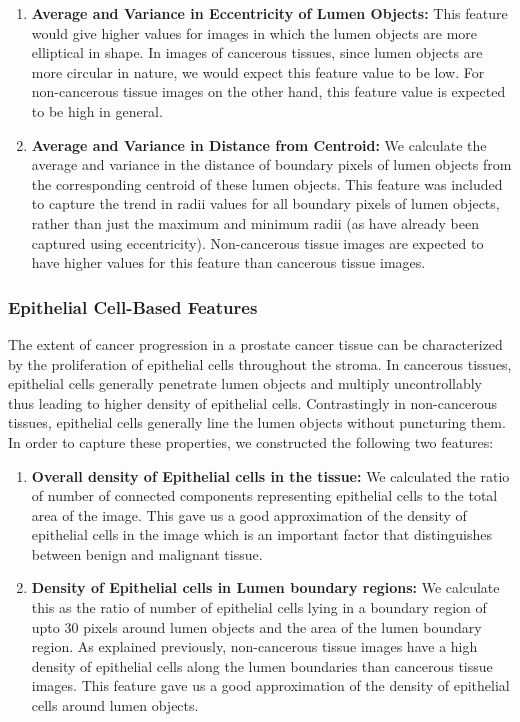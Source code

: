 \begin{enumerate}
\item \textbf{Average and Variance in Eccentricity of Lumen Objects:} This feature would give higher values for images in which the lumen objects are more elliptical in shape. In images of cancerous tissues, since lumen objects are more circular in nature, we would expect this feature value to be low. For non-cancerous tissue images on the other hand, this feature value is expected to be high in general.

\item \textbf{Average and Variance in Distance from Centroid:} We calculate the average and variance in the distance of boundary pixels of lumen objects from the corresponding centroid of these lumen objects. This feature was included to capture the trend in radii values for all boundary pixels of lumen objects, rather than just the maximum and minimum radii (as have already been captured using eccentricity). Non-cancerous tissue images are expected to have higher values for this feature than cancerous tissue images.

\end{enumerate}

\subsubsection{Epithelial Cell-Based Features}
The extent of cancer progression in a prostate cancer tissue can be characterized by the proliferation of epithelial cells throughout the stroma. In cancerous tissues, epithelial cells generally penetrate lumen objects and multiply uncontrollably thus leading to higher density of epithelial cells. Contrastingly in non-cancerous tissues, epithelial cells generally line the lumen objects without puncturing them. In order to capture these properties, we constructed the following two features:

\begin{enumerate}
\item \textbf{Overall density of Epithelial cells in the tissue:} We calculated the ratio of number of connected components representing epithelial cells to the total area of the image. This gave us a good approximation of the density of epithelial cells in the image which is an important factor that distinguishes between benign and malignant tissue.

\item \textbf{Density of Epithelial cells in Lumen boundary regions:} We calculate this as the ratio of number of epithelial cells lying in a boundary region of upto 30 pixels around lumen objects and the area of the lumen boundary region. As explained previously, non-cancerous tissue images have a high density of epithelial cells along the lumen boundaries than cancerous tissue images. This feature gave us a good approximation of the density of epithelial cells around lumen objects.

\end{enumerate}

